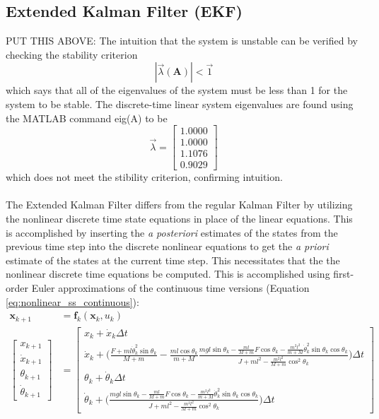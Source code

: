 \documentclass{article}
\newcommand{\matr}[1]{\bm{#1}}     %
\begin{document}
\subsection{Extended Kalman Filter (EKF)}
PUT THIS ABOVE:
The intuition that the system is unstable can be verified by checking the stability criterion
\begin{equation}
|\vec{\lambda}(\matr{A})| < \vec{1}
\end{equation}
which says that all of the eigenvalues of the system must be less than 1 for the system to be stable. The discrete-time linear system eigenvalues are found using the MATLAB command eig(A) to be
\begin{equation}
\vec{\lambda} = \begin{bmatrix}
    1.0000 \\
    1.0000 \\
    1.1076 \\
    0.9029
\end{bmatrix}
\end{equation}
which does not meet the stibility criterion, confirming intuition.\\
\\
The Extended Kalman Filter differs from the regular Kalman Filter by utilizing the nonlinear discrete time state equations in place of the linear equations. This is accomplished by inserting the \textit{a posteriori} estimates of the states from the previous time step into the discrete nonlinear equations to get the \textit{a priori} estimate of the states at the current time step. This necessitates that the the nonlinear discrete time equations be computed. This is accomplished using first-order Euler approximations of the continuous time versions (Equation \ref{eq:nonlinear_ss_continuous}):
\begin{equation}
\begin{aligned}
\matr{x}_{k+1} &= \matr{f}_k (\matr{x}_k,u_k) \\
\begin{bmatrix}
x_{k+1} \\[8pt]
\dot{x}_{k+1} \\[8pt]
\theta_{k+1} \\[8pt]
\dot{\theta}_{k+1}
\end{bmatrix} &= \begin{bmatrix}
x_k + \dot{x}_k \Delta t \\
\dot{x}_k + \biggr(\frac{F+ml\dot{\theta}_k^2\sin\theta_k}{M+m} -\frac{ml\cos\theta_k}{m+M}\frac{mgl\sin\theta_k- \frac{ml}{M+m} F\cos\theta_k -\frac{m^2l^2}{m+M}\dot{\theta}_k^2\sin\theta_k\cos\theta_k}{J+ml^2-\frac{m^2l^2}{M+m}\cos^2 \theta_k}\biggr) \Delta t  \\
\theta_k + \dot{\theta}_k \Delta t \\
\dot{\theta}_k + \biggr(\frac{mgl\sin\theta_k - \frac{ml}{M+m} F\cos\theta_k -\frac{m^2l^2}{m+M}\dot{\theta}_k^2\sin\theta_k\cos\theta_k}{J+ml^2-\frac{m^2l^2}{M+m}\cos^2 \theta_k}\biggr) \Delta t
\end{bmatrix}
\end{aligned}
\end{equation}
\end{document}
